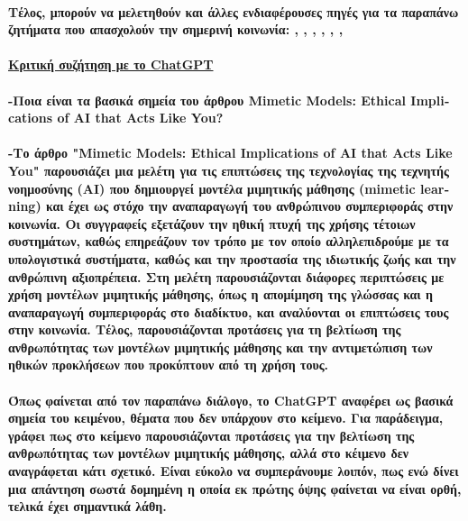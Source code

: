 \documentclass[12pt, A4]{article}
\newcommand{\tl}{\textlatin}
\begin{document}
    \paragraph{Τέλος, μπορούν να μελετηθούν και άλλες ενδιαφέρουσες πηγές για τα παραπάνω ζητήματα που απασχολούν την σημερινή κοινωνία: \cite{article1}, \cite{article6}, \cite{article7}, \cite{article8}, \cite{article9}, \cite{article10}, \cite{article11}\\}
    
    \paragraph{\underline{Κριτική συζήτηση με το \tl{ChatGPT}}}
    \paragraph{-Ποια είναι τα βασικά σημεία του άρθρου \tl{Mimetic Models: Ethical Implications of AI that Acts Like You}?\\~\\
    -Το άρθρο \tl{"Mimetic Models: Ethical Implications of AI that Acts Like You"} παρουσιάζει μια μελέτη για τις επιπτώσεις της τεχνολογίας της τεχνητής νοημοσύνης (AI) που δημιουργεί μοντέλα μιμητικής μάθησης (\tl{mimetic learning}) και έχει ως στόχο την αναπαραγωγή του ανθρώπινου συμπεριφοράς στην κοινωνία. Οι συγγραφείς εξετάζουν την ηθική πτυχή της χρήσης τέτοιων συστημάτων, καθώς επηρεάζουν τον τρόπο με τον οποίο αλληλεπιδρούμε με τα υπολογιστικά συστήματα, καθώς και την προστασία της ιδιωτικής ζωής και την ανθρώπινη αξιοπρέπεια. Στη μελέτη παρουσιάζονται διάφορες περιπτώσεις με χρήση μοντέλων μιμητικής μάθησης, όπως η απομίμηση της γλώσσας και η αναπαραγωγή συμπεριφοράς στο διαδίκτυο, και αναλύονται οι επιπτώσεις τους στην κοινωνία. Τέλος, παρουσιάζονται προτάσεις για τη βελτίωση της ανθρωπότητας των μοντέλων μιμητικής μάθησης και την αντιμετώπιση των ηθικών προκλήσεων που προκύπτουν από τη χρήση τους.\\~\\
    Όπως φαίνεται από τον παραπάνω διάλογο, το \tl{ChatGPT} αναφέρει ως βασικά σημεία του κειμένου, θέματα που δεν υπάρχουν στο κείμενο. Για παράδειγμα, γράφει πως στο κείμενο παρουσιάζονται προτάσεις για την βελτίωση της ανθρωπότητας των μοντέλων μιμητικής μάθησης, αλλά στο κέιμενο δεν αναγράφεται κάτι σχετικό. Είναι εύκολο να συμπεράνουμε λοιπόν, πως ενώ δίνει μια απάντηση σωστά δομημένη η οποία εκ πρώτης όψης φαίνεται να είναι ορθή, τελικά έχει σημαντικά λάθη.}
    
\end{document}
